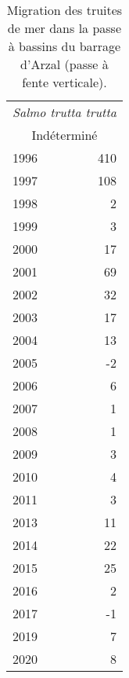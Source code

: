 \begin{table}[ht]
\centering
\begin{tabular}{lr}
  \toprule
  \multicolumn{2}{c}{\textit{Salmo trutta trutta}}  \\
\multicolumn{2}{c}{Indéterminé} \\
 \midrule
1996 & 410 \\ 
  1997 & 108 \\ 
  1998 & 2 \\ 
  1999 & 3 \\ 
  2000 & 17 \\ 
  2001 & 69 \\ 
  2002 & 32 \\ 
  2003 & 17 \\ 
  2004 & 13 \\ 
  2005 & -2 \\ 
  2006 & 6 \\ 
  2007 & 1 \\ 
  2008 & 1 \\ 
  2009 & 3 \\ 
  2010 & 4 \\ 
  2011 & 3 \\ 
  2013 & 11 \\ 
  2014 & 22 \\ 
  2015 & 25 \\ 
  2016 & 2 \\ 
  2017 & -1 \\ 
  2019 & 7 \\ 
  2020 & 8 \\ 
   \bottomrule
\end{tabular}
\caption{Migration des truites de mer dans la passe à bassins du barrage
				d'Arzal (passe à fente verticale).} 
\label{table_bilanannuel_trm}
\end{table}

